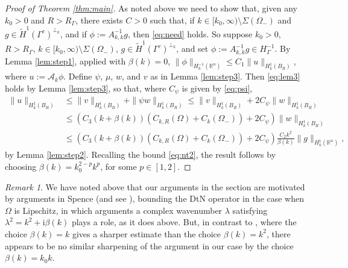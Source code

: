 \documentclass{birkjour}
\theoremstyle{definition}
\theoremstyle{remark}
\newtheorem{remark}[theorem]{Remark}
\numberwithin{equation}{section}
\newcommand{\R}{\mathbb{R}}
\newcommand{\ri}{\mathrm{i}}
\newcommand{\cA}{\mathcal{A}}
\begin{document}
\begin{proof}[Proof of Theorem \ref{thm:main}]
As noted above we need to show that, given any $k_0>0$ and $R>R_\Gamma$, there exists $C>0$ such that, if  $k\in [k_0,\infty)\setminus \Sigma(\Omega_-)$ and $g\in \widetilde H^1(\Gamma^c)^{\perp_k}$, and if $\phi:=A_{k,k}^{-1}g$, then \eqref{eq:need} holds. So suppose $k_0>0$, $R>R_\Gamma$,  $k\in [k_0,\infty)\setminus \Sigma(\Omega_-)$, $g\in \widetilde H^1(\Gamma^c)^{\perp_k}$, and set $\phi:=A_{k,k}^{-1}g\in H^{-1}_\Gamma$. By Lemma \ref{lem:step1}, applied with $\beta(k)=0$, $\|\phi\|_{H_k^{-1}(\R^n)}\leq C_1 \|u\|_{H_k^1(B_R)}$, where $u:= \cA_k \phi$. Define $\psi$, $\mu$, $w$, and $v$ as in Lemma \ref{lem:step3}. Then \eqref{eq:lem3} holds by Lemma \ref{lem:step3}, so that, where $C_\psi$ is given by \eqref{eq:psi},
\begin{align*}
\|u\|_{H^1_k(B_R)} &\leq \|v\|_{H^1_k(B_R)} + \|\psi w\|_{H^1_k(B_R)} \leq  \|v\|_{H^1_k(B_R)} + 2C_\psi \|w\|_{H^1_k(B_R)}\\
&\leq \left(C_3 (k+\beta(k))\left(C_{k,R}(\Omega)+C_k(\Omega_-)\right) + 2C_\psi\right)\|w\|_{H^1_k(B_R)}\\
& \leq  \left(C_3 (k+\beta(k))\left(C_{k,R}(\Omega)+C_k(\Omega_-)\right) + 2C_\psi\right)\frac{C_2k^2}{\beta(k)} \|g\|_{H^1_k(\R^n)},
\end{align*}
by Lemma \ref{lem:step2}. Recalling the bound \eqref{eq:nt2}, the result follows by choosing $\beta(k)=k^{2-p}_0 k^p$, for some $p\in [1,2]$. 
\end{proof}

\begin{remark} \label{rem:spence}
We have noted above that our arguments in the section are motivated by arguments in Spence \cite[\S3]{spence2014wavenumber} (and see \cite[Lemma 4.2]{chandler2020high}), bounding the DtN operator in the case when $\Omega$ is Lipschitz, in which arguments a complex wavenumber $\lambda$ satisfying $\lambda^2 = k^2+\ri \beta(k)$ plays a role, as it does above. But, in contrast to  \cite[\S3]{spence2014wavenumber}, where the choice $\beta(k) = k$ gives a sharper estimate than the choice $\beta(k)=k^2$, there appears to be no similar sharpening of the argument in our case by the choice $\beta(k)=k_0k$.
\end{remark}
\end{document}
